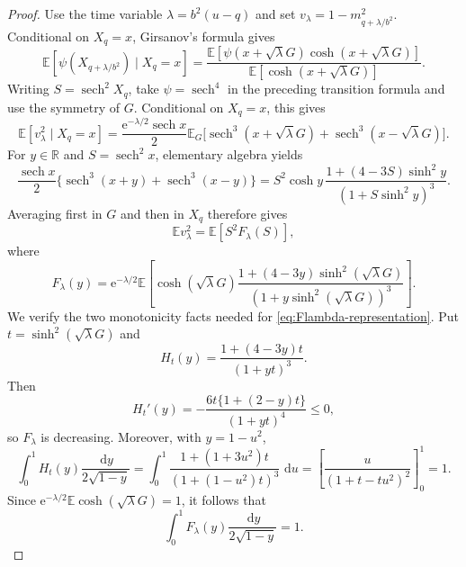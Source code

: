 \documentclass[11pt]{article}
\numberwithin{equation}{section}
\theoremstyle{plain}
\theoremstyle{definition}
\newcommand{\E}{\mathbb E}
\newcommand{\1}{\mathbf 1}
\newcommand{\sech}{\operatorname{sech}}
\newcommand{\dd}{\,\mathrm d}
\newcommand{\e}{\mathrm e}
\begin{document}
\begin{proof}
Use the time variable $\lambda=b^2(u-q)$ and set
$v_\lambda=1-m_{q+\lambda/b^2}^2$.  Conditional on $X_q=x$,
Girsanov's formula gives
\[
 \E[\psi(X_{q+\lambda/b^2})\mid X_q=x]
 =
 \frac{\E[\psi(x+\sqrt\lambda G)\cosh(x+\sqrt\lambda G)]}
      {\E[\cosh(x+\sqrt\lambda G)]}.
\]
Writing $S=\sech^2X_q$, take $\psi=\sech^4$ in the preceding
transition formula and use the symmetry of $G$.  Conditional on
$X_q=x$, this gives
\[
 \E[v_\lambda^2\mid X_q=x]
 =\frac{\e^{-\lambda/2}\sech x}{2}\E_G
 \bigl[\sech^3(x+\sqrt\lambda G)
       +\sech^3(x-\sqrt\lambda G)\bigr].
\]
For $y\in\mathbb R$ and $S=\sech^2x$, elementary algebra yields
\[
 \frac{\sech x}{2}\{\sech^3(x+y)+\sech^3(x-y)\}
 =S^2\cosh y\,
 \frac{1+(4-3S)\sinh^2y}{(1+S\sinh^2y)^3}.
\]
Averaging first in $G$ and then in $X_q$ therefore gives
\begin{equation}
 \E v_\lambda^2=\E[S^2F_\lambda(S)],
 \label{eq:Flambda-representation}
\end{equation}
where
\begin{equation}
 F_\lambda(y)=\e^{-\lambda/2}\E\left[
 \cosh(\sqrt\lambda G)
 \frac{1+(4-3y)\sinh^2(\sqrt\lambda G)}
      {(1+y\sinh^2(\sqrt\lambda G))^3}\right].
 \label{eq:Flambda}
\end{equation}
We verify the two monotonicity facts needed for
\eqref{eq:Flambda-representation}.  Put $t=\sinh^2(\sqrt\lambda G)$
and
\[
 H_t(y)=\frac{1+(4-3y)t}{(1+yt)^3}.
\]
Then
\[
 H_t'(y)=-\frac{6t\{1+(2-y)t\}}{(1+yt)^4}\le0,
\]
so $F_\lambda$ is decreasing.  Moreover, with
$y=1-u^2$,
\[
 \int_0^1H_t(y)\frac{\dd y}{2\sqrt{1-y}}
 =\int_0^1\frac{1+(1+3u^2)t}{(1+(1-u^2)t)^3}\,\dd u
 =\left[\frac{u}{(1+t-tu^2)^2}\right]_{0}^{1}=1.
\]
Since $\e^{-\lambda/2}\E\cosh(\sqrt\lambda G)=1$, it follows that
\begin{equation}
 \int_0^1F_\lambda(y)\frac{\dd y}{2\sqrt{1-y}}=1.
 \label{eq:Fmeanone}
\end{equation}


\end{proof}
\end{document}
